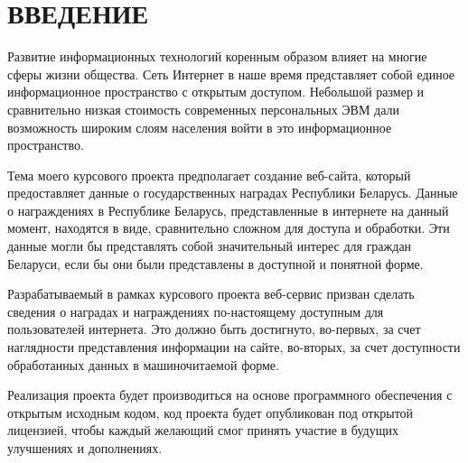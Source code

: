 \section*{ВВЕДЕНИЕ}

Развитие информационных технологий коренным образом влияет 
на многие сферы жизни общества.
Сеть Интернет в наше время представляет собой единое
информационное пространство с открытым доступом.
Небольшой размер и сравнительно низкая стоимость современных
персональных ЭВМ дали возможность широким слоям населения
войти в это информационное пространство.

Тема моего курсового проекта предполагает создание веб-сайта,
который предоставляет данные о государственных наградах 
Республики Беларусь.
Данные о награждениях в Республике Беларусь, 
представленные в интернете на данный момент, находятся в виде, 
сравнительно сложном для доступа и обработки.
Эти данные могли бы представлять собой значительный интерес для
граждан Беларуси, если бы они были представлены в доступной и понятной форме.

Разрабатываемый в рамках курсового проекта веб-сервис призван
сделать сведения о наградах и награждениях
по-настоящему доступным для пользователей интернета.
Это должно быть достигнуто, во-первых, за счет наглядности представления 
информации на сайте, во-вторых, за счет доступности
обработанных данных в машиночитаемой форме. 

Реализация проекта будет производиться 
на основе программного обеспечения с открытым исходным кодом,
код проекта будет опубликован под открытой лицензией, чтобы каждый желающий
смог принять участие в будущих улучшениях и дополнениях.
